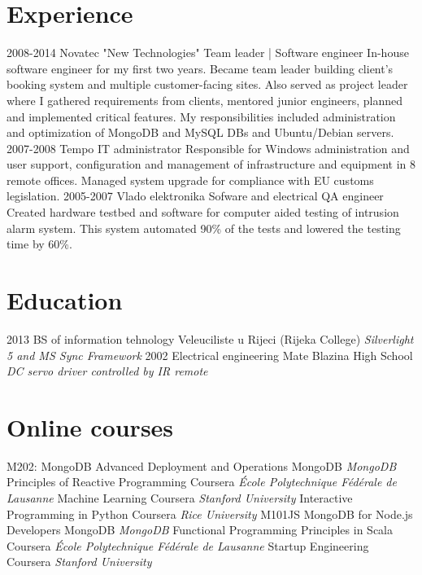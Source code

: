 \documentclass[]{cv}
\begin{document}
\section{Experience}
\begin{entrylist}
  \entry
    {2008-2014}
    {Novatec "New Technologies"}
    {Team leader | Software engineer}
    {In-house software engineer for my first two years. Became team leader building client's booking system and multiple customer-facing sites. Also served as project leader where I gathered requirements from clients, mentored junior engineers, planned and implemented critical features. My responsibilities included administration and optimization of MongoDB and MySQL DBs and Ubuntu/Debian servers.}
  \entry
    {2007-2008}
    {Tempo}
    {IT administrator}
    {Responsible for Windows administration and user support, configuration and management of infrastructure and equipment in 8 remote offices. Managed system upgrade for compliance with EU customs legislation.}
  \entry
    {2005-2007}
    {Vlado elektronika}
    {Sofware and electrical QA engineer}
    {Created hardware testbed and software for computer aided testing of intrusion alarm system. This system automated 90\% of the tests and lowered the testing time by 60\%.}
\end{entrylist}

\section{Education}
\begin{entrylist}
  \entry
    {2013}
    {BS of information tehnology}
    {Veleuciliste u Rijeci (Rijeka College)}
    {\emph{Silverlight 5 and MS Sync Framework}}
  \entry
    {2002}
    {Electrical engineering}
    {Mate Blazina High School}
    {\emph{DC servo driver controlled by IR remote}}
\end{entrylist}
\section{Online courses}
\begin{entrylist}
  \entry
    {} 
    {M202: MongoDB Advanced Deployment and Operations}
    {MongoDB}
    {\emph{MongoDB}}
  \entry
    {}
    {Principles of Reactive Programming}
    {Coursera}
    {\emph{École Polytechnique Fédérale de Lausanne}}
  \entry
    {}
    {Machine Learning} 
    {Coursera}
    {\emph{Stanford University}}
  \entry
    {}
    {Interactive Programming in Python}
    {Coursera}
    {\emph{Rice University}}
  \entry
    {}
    {M101JS MongoDB for Node.js Developers}
    {MongoDB}
    {\emph{MongoDB}}
  \entry
    {}
    {Functional Programming Principles in Scala}
    {Coursera}
    {\emph{École Polytechnique Fédérale de Lausanne}}
  \entry
    {}
    {Startup Engineering}
    {Coursera}
    {\emph{Stanford University}}
\end{entrylist}
\end{document}
